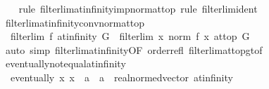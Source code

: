 \begin{isabellebody}
%
\isadelimproof
\ \ %
\endisadelimproof
%
\isatagproof
{}\isamarkupfalse%
\ {\isacharparenleft}{\kern0pt}rule\ filterlim{\isacharunderscore}{\kern0pt}at{\isacharunderscore}{\kern0pt}infinity{\isacharunderscore}{\kern0pt}imp{\isacharunderscore}{\kern0pt}norm{\isacharunderscore}{\kern0pt}at{\isacharunderscore}{\kern0pt}top{\isacharparenright}{\kern0pt}\ {\isacharparenleft}{\kern0pt}rule\ filterlim{\isacharunderscore}{\kern0pt}ident{\isacharparenright}{\kern0pt}%
\endisatagproof
{\isafoldproof}%
%
\isadelimproof
\isanewline
%
\endisadelimproof
\isanewline
{}\isamarkupfalse%
\ filterlim{\isacharunderscore}{\kern0pt}at{\isacharunderscore}{\kern0pt}infinity{\isacharunderscore}{\kern0pt}conv{\isacharunderscore}{\kern0pt}norm{\isacharunderscore}{\kern0pt}at{\isacharunderscore}{\kern0pt}top{\isacharcolon}{\kern0pt}\isanewline
\ \ {\isachardoublequoteopen}filterlim\ f\ at{\isacharunderscore}{\kern0pt}infinity\ G\ {\isasymlongleftrightarrow}\ filterlim\ {\isacharparenleft}{\kern0pt}{\isasymlambda}x{\isachardot}{\kern0pt}\ norm\ {\isacharparenleft}{\kern0pt}f\ x{\isacharparenright}{\kern0pt}{\isacharparenright}{\kern0pt}\ at{\isacharunderscore}{\kern0pt}top\ G{\isachardoublequoteclose}\isanewline
%
\isadelimproof
\ \ %
\endisadelimproof
%
\isatagproof
{}\isamarkupfalse%
\ {\isacharparenleft}{\kern0pt}auto\ simp{\isacharcolon}{\kern0pt}\ filterlim{\isacharunderscore}{\kern0pt}at{\isacharunderscore}{\kern0pt}infinity{\isacharbrackleft}{\kern0pt}OF\ order{\isachardot}{\kern0pt}refl{\isacharbrackright}{\kern0pt}\ filterlim{\isacharunderscore}{\kern0pt}at{\isacharunderscore}{\kern0pt}top{\isacharunderscore}{\kern0pt}gt{\isacharbrackleft}{\kern0pt}of\ {\isacharunderscore}{\kern0pt}\ {\isacharunderscore}{\kern0pt}\ {}{\isacharbrackright}{\kern0pt}{\isacharparenright}{\kern0pt}%
\endisatagproof
{\isafoldproof}%
%
\isadelimproof
\isanewline
%
\endisadelimproof
\isanewline
{}\isamarkupfalse%
\ eventually{\isacharunderscore}{\kern0pt}not{\isacharunderscore}{\kern0pt}equal{\isacharunderscore}{\kern0pt}at{\isacharunderscore}{\kern0pt}infinity{\isacharcolon}{\kern0pt}\isanewline
\ \ {\isachardoublequoteopen}eventually\ {\isacharparenleft}{\kern0pt}{\isasymlambda}x{\isachardot}{\kern0pt}\ x\ {\isasymnoteq}\ {\isacharparenleft}{\kern0pt}a\ {\isacharcolon}{\kern0pt}{\isacharcolon}{\kern0pt}\ {\isacharprime}{\kern0pt}a\ {\isacharcolon}{\kern0pt}{\isacharcolon}{\kern0pt}\ {\isacharbraceleft}{\kern0pt}real{\isacharunderscore}{\kern0pt}normed{\isacharunderscore}{\kern0pt}vector{\isacharbraceright}{\kern0pt}{\isacharparenright}{\kern0pt}{\isacharparenright}{\kern0pt}\ at{\isacharunderscore}{\kern0pt}infinity{\isachardoublequoteclose}\isanewline

\end{isabellebody}
